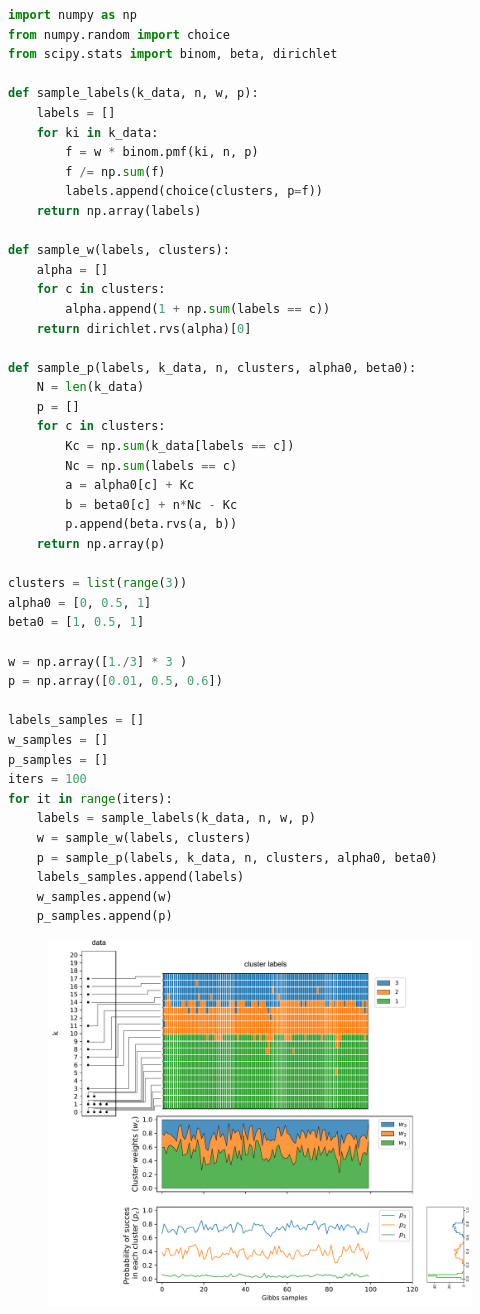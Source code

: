 \begin{lstlisting}[language=python]
import numpy as np
from numpy.random import choice
from scipy.stats import binom, beta, dirichlet

def sample_labels(k_data, n, w, p):
    labels = []
    for ki in k_data:
        f = w * binom.pmf(ki, n, p)
        f /= np.sum(f)
        labels.append(choice(clusters, p=f))
    return np.array(labels)

def sample_w(labels, clusters):
    alpha = []
    for c in clusters:
        alpha.append(1 + np.sum(labels == c))
    return dirichlet.rvs(alpha)[0]

def sample_p(labels, k_data, n, clusters, alpha0, beta0):
    N = len(k_data)
    p = []
    for c in clusters:
        Kc = np.sum(k_data[labels == c])
        Nc = np.sum(labels == c)
        a = alpha0[c] + Kc
        b = beta0[c] + n*Nc - Kc
        p.append(beta.rvs(a, b))
    return np.array(p)

clusters = list(range(3))
alpha0 = [0, 0.5, 1]
beta0 = [1, 0.5, 1]

w = np.array([1./3] * 3 )
p = np.array([0.01, 0.5, 0.6])

labels_samples = []
w_samples = []
p_samples = []
iters = 100
for it in range(iters):
    labels = sample_labels(k_data, n, w, p)
    w = sample_w(labels, clusters)
    p = sample_p(labels, k_data, n, clusters, alpha0, beta0)
    labels_samples.append(labels)
    w_samples.append(w)
    p_samples.append(p)
\end{lstlisting}

\begin{figure}[h]
\centering
\includegraphics[width=\textwidth]{./figs/08-gibbs-binomial-samples.pdf}
\end{figure}

